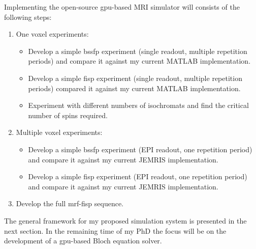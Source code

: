 \begin{enumerate}
\begin{itemize}
	\end{itemize}
	
	Implementing the open-source \ac{gpu}-based MRI simulator will consists of the following steps:
	\begin{enumerate}
	    
	    \item One voxel experiments:
	    \begin{itemize}
	        \item Develop a simple \ac{bssfp} experiment (single readout, multiple repetition periods) and compare it against my current MATLAB implementation.
	        
	        \item Develop a simple \ac{fisp} experiment (single readout, multiple repetition periods) compared it against my current MATLAB implementation.
	        
	        \item Experiment with different numbers of isochromats and find the critical number of spins required.
	    \end{itemize}
	    
	    \item Multiple voxel experiments:
	    \begin{itemize}
	        \item Develop a simple \ac{bssfp} experiment (EPI readout, one repetition period) and compare it against my current JEMRIS implementation.
	        
	        \item Develop a simple \ac{fisp} experiment (EPI readout, one repetition period) and compare it against my current JEMRIS implementation.
	        
	    \end{itemize}
	    
	    \item Develop the full \ac{mrf}-\ac{fisp} sequence.
	    
	\end{enumerate}	
	
	The general framework for my proposed simulation system is presented in the next section.
	In the remaining time of my PhD the focus will be on the development of a \ac{gpu}-based Bloch equation solver.
	
	

\end{enumerate}
